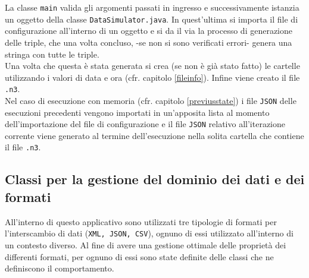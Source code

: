 \documentclass[12pt,a4paper,italian]{article}
\begin{document}
	La classe \texttt{main} valida gli argomenti passati in ingresso e successivamente istanzia un oggetto della classe \texttt{DataSimulator.java}.
	In quest'ultima si importa il file di configurazione all'interno di un oggetto e si da il via la processo di generazione delle triple, che una volta concluso, -se non si sono verificati errori- genera una stringa con tutte le triple. \\Una volta che questa è stata generata si crea (se non è già stato fatto) le cartelle utilizzando i valori di data e ora (cfr. capitolo \ref{fileinfo}). Infine viene creato il file \texttt{.n3}.\\
	\newline
	Nel caso di esecuzione con memoria (cfr. capitolo \ref{previusstate}) i file \texttt{JSON} delle esecuzioni precedenti vengono importati in un'apposita lista al momento dell'importazione del file di configurazione e il file \texttt{JSON} relativo all'iterazione corrente viene generato al termine dell'esecuzione nella solita cartella che contiene il file \texttt{.n3}.
	
	\subsection{Classi per la gestione del dominio dei dati e dei formati}
	All'interno di questo applicativo sono utilizzati tre tipologie di formati per l'interscambio di dati (\texttt{XML, JSON, CSV}), ognuno di essi utilizzato all'interno di un contesto diverso. Al fine di avere una gestione ottimale delle proprietà dei differenti formati, per ognuno di essi sono state definite delle classi che ne definiscono il comportamento.
	
\end{document}
